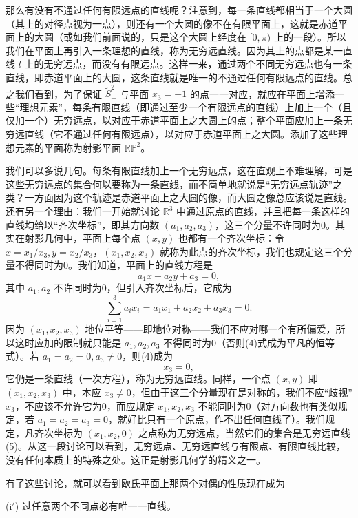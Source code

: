 那么有没有不通过任何有限远点的直线呢？注意到，每一条直线都相当于一个大圆（其上的对径点视为一点），则还有一个大圆的像不在有限平面上，这就是赤道平面上的大圆（或如我们前面说的，只是这个大圆上经度在 $[0,\pi)$ 上的一段）。所以我们在平面上再引入一条理想的直线，称为无穷远直线。因为其上的点都是某一直线 $l$ 上的无穷远点，而没有有限远点。这样一来，通过两个不同无穷远点也有一条直线，即赤道平面上的大圆，这条直线就是唯一的不通过任何有限远点的直线。总之我们看到，为了保证 $\widetilde S_-^2$ 与平面 $x_3=-1$ 的点一一对应，就应在平面上增添一些“理想元素”，每条有限直线（即通过至少一个有限远点的直线）上加上一个（且仅加一个）无穷远点，以对应于赤道平面上之大圆上的点；整个平面应加上一条无穷远直线（它不通过任何有限远点），以对应于赤道平面上之大圆。添加了这些理想元素的平面称为射影平面 $\mathbb{RP}^2$。

我们可以多说几句。每条有限直线加上一个无穷远点，这在直观上不难理解，可是这些无穷远点的集合何以要称为一条直线，而不简单地就说是“无穷远点轨迹”之类？一方面因为这个轨迹是赤道平面上之大圆的像，而大圆之像总应该说是直线。还有另一个理由：我们一开始就讨论 $\mathbb R^3$ 中通过原点的直线，并且把每一条这样的直线均给以“齐次坐标”，即其方向数 $(a_1,a_2,a_3)$，这三个分量不许同时为0。其实在射影几何中，平面上每个点 $(x,y)$ 也都有一个齐次坐标：令 $x=x_1/x_3,y=x_2/x_3$，$(x_1,x_2,x_3)$ 就称为此点的齐次坐标，我们也规定这三个分量不得同时为0。我们知道，平面上的直线方程是
\[
 a_1x+a_2y+a_3=0,
\]
其中 $a_1,a_2$ 不许同时为0，但引入齐次坐标后，它成为
\begin{equation}
 \sum_{i=1}^3 a_i x_i=a_1x_1+a_2x_2+a_3x_3=0.
 \tag{4}
\end{equation}
因为 $(x_1,x_2,x_3)$ 地位平等——即地位对称——我们不应对哪一个有所偏爱，所以这时应加的限制就只能是 $a_1,a_2,a_3$ 不得同时为0（否则(4)式成为平凡的恒等式）。若 $a_1=a_2=0,a_3\ne0$，则(4)成为
\begin{equation}
 x_3=0,
 \tag{5}
\end{equation}
它仍是一条直线（一次方程），称为无穷远直线。同样，一个点 $(x,y)$ 即 $(x_1,x_2,x_3)$ 中，本应 $x_3\ne0$，但由于这三个分量现在是对称的，我们不应“歧视”$x_3$，不应该不允许它为0，而应规定 $x_1,x_2,x_3$ 不能同时为0（对方向数也有类似规定，若 $a_1=a_2=a_3=0$，就好比只有一个原点，作不出任何直线了）。我们规定，凡齐次坐标为 $(x_1,x_2,0)$ 之点称为无穷远点，当然它们的集合是无穷远直线(5)。从这一段讨论可以看到，无穷远点、无穷远直线与有限点、有限直线比较，没有任何本质上的特殊之处。这正是射影几何学的精义之一。

有了这些讨论，就可以看到欧氏平面上那两个对偶的性质现在成为

\noindent(i$'$) 过任意两个不同点必有唯一一直线。

